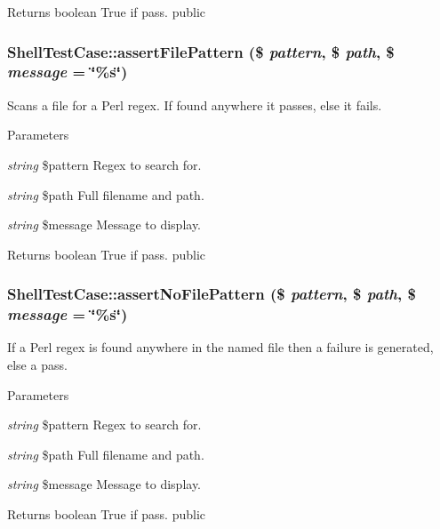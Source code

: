\begin{DoxyReturn}{Returns}
boolean True if pass.  public 
\end{DoxyReturn}
\hypertarget{class_shell_test_case_a431dc8207ce018d6d6f48f35d30e9f8e}{
\subsubsection[{assertFilePattern}]{\setlength{\rightskip}{0pt plus 5cm}ShellTestCase::assertFilePattern (\$ {\em pattern}, \/  \$ {\em path}, \/  \$ {\em message} = {\ttfamily \char`\"{}\%s\char`\"{}})}}
\label{class_shell_test_case_a431dc8207ce018d6d6f48f35d30e9f8e}
Scans a file for a Perl regex. If found anywhere it passes, else it fails. 
\begin{DoxyParams}{Parameters}
\item[{\em string}]\$pattern Regex to search for. \item[{\em string}]\$path Full filename and path. \item[{\em string}]\$message Message to display. \end{DoxyParams}
\begin{DoxyReturn}{Returns}
boolean True if pass.  public 
\end{DoxyReturn}
\hypertarget{class_shell_test_case_a11e982abca8dcdc022aecef4866a31b1}{
\subsubsection[{assertNoFilePattern}]{\setlength{\rightskip}{0pt plus 5cm}ShellTestCase::assertNoFilePattern (\$ {\em pattern}, \/  \$ {\em path}, \/  \$ {\em message} = {\ttfamily \char`\"{}\%s\char`\"{}})}}
\label{class_shell_test_case_a11e982abca8dcdc022aecef4866a31b1}
If a Perl regex is found anywhere in the named file then a failure is generated, else a pass. 
\begin{DoxyParams}{Parameters}
\item[{\em string}]\$pattern Regex to search for. \item[{\em string}]\$path Full filename and path. \item[{\em string}]\$message Message to display. \end{DoxyParams}
\begin{DoxyReturn}{Returns}
boolean True if pass.  public 
\end{DoxyReturn}
